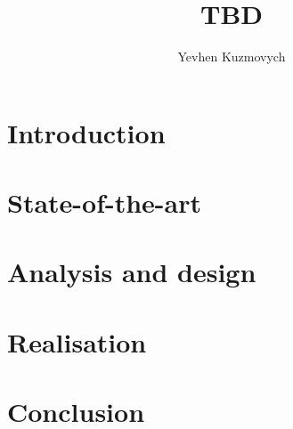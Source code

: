 \documentclass[thesis=M,english,hidelinks]{FITthesis}[2012/10/20]
\title{TBD}
\author{Yevhen Kuzmovych} %
\begin{document}

\newcommand{\smplimage}[3][1]{
\centerline{\texttt{[image: \#2.\#3]}}
}

\newcommand{\image}[4][1]{
\begin{figure}[H]
	\smplimage[#1]{#2}{#3}
	\caption{#4}
	\label{fig:#2}
\end{figure}
}


\newcommand{\class}[1]{\textit{\mbox#1}}
\newcommand{\method}[1]{\textit{\mbox#1}}
\newcommand{\field}[1]{\textit{\mbox#1}}
\newcommand{\app}[1]{\textit{\mbox#1}}
\newcommand{\file}[1]{\textit{\mbox#1}}
\newcommand{\bash}[1]{\textit{\mbox#1}}
\newcommand{\module}[1]{\textit{\mbox#1}}

\newcommand{\m}[1]{\mbox{#1}}

\newcommand{\definition}[1]{\textit{\textbf{\mbox{#1}}}}


\chapter{Introduction}\label{ch:introduction}


\chapter{State-of-the-art}\label{ch:state-of-the-art}


\chapter{Analysis and design}\label{ch:analysis-and-design}


\chapter{Realisation}\label{ch:realisation}


\chapter{Conclusion}\label{ch:conclusion}

\end{document}
